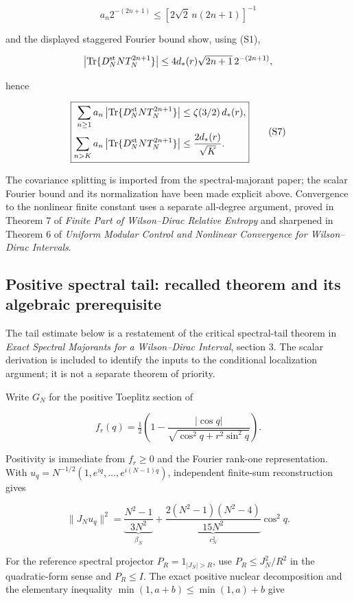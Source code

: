 \documentclass[
  10pt,
  a4paper,
]{article}
\begin{document}
\[
 a_n2^{-(2n+1)}\le[2\sqrt2\,n(2n+1)]^{-1}
\]

and the displayed staggered Fourier bound show, using (S1),

\[
\left|\operatorname{Tr}\{D_N^{\rm st}N T_N^{2n+1}\}\right|
\le4d_*(r)\sqrt{2n+1}\,2^{-(2n+1)},
\]

hence

\[
\boxed{\begin{aligned}
 \sum_{n\ge1}a_n\left|\operatorname{Tr}\{D_N^{\rm st}NT_N^{2n+1}\}\right|&\le\zeta(3/2)\,d_*(r),\\
 \sum_{n>K}a_n\left|\operatorname{Tr}\{D_N^{\rm st}NT_N^{2n+1}\}\right|&\le\frac{2d_*(r)}{\sqrt K}.
\end{aligned}}
\tag{S7}
\]

The covariance splitting is imported from the spectral-majorant paper; the scalar Fourier bound and its normalization have been made explicit above. Convergence to the nonlinear finite constant uses a separate all-degree argument, proved in Theorem 7 of \emph{Finite Part of Wilson--Dirac Relative Entropy} and sharpened in Theorem 6 of \emph{Uniform Modular Control and Nonlinear Convergence for Wilson--Dirac Intervals}.

\subsection{Positive spectral tail: recalled theorem and its algebraic prerequisite}\label{positive-spectral-tail-recalled-theorem-and-its-algebraic-prerequisite}

The tail estimate below is a restatement of the critical spectral-tail theorem in \emph{Exact Spectral Majorants for a Wilson--Dirac Interval}, section 3. The scalar derivation is included to identify the inputs to the conditional localization argument; it is not a separate theorem of priority.

Write \(G_N\) for the positive Toeplitz section of

\[
f_r(q)=\tfrac12\left(1-\frac{|\cos q|}{\sqrt{\cos^2q+r^2\sin^2q}}\right).
\]

Positivity is immediate from \(f_r\ge 0\) and the Fourier rank-one representation. With \(u_q=N^{-1/2}(1,e^{iq},\ldots ,e^{i(N-1)q})\), independent finite-sum reconstruction gives

\[
\|J_Nu_q\|^2=\underbrace{\frac{N^2-1}{3N^2}}_{\beta_N}+
\underbrace{\frac{2(N^2-1)(N^2-4)}{15N^2}}_{c_N^2}\cos^2q.
\]

For the reference spectral projector \(P_R=1_{|J_N|>R}\), use \(P_R\le J_N^2/R^2\) in the quadratic-form sense and \(P_R\le I\). The exact positive nuclear decomposition and the elementary inequality \(\min(1,a+b)\le \min(1,a)+b\) give
\end{document}
